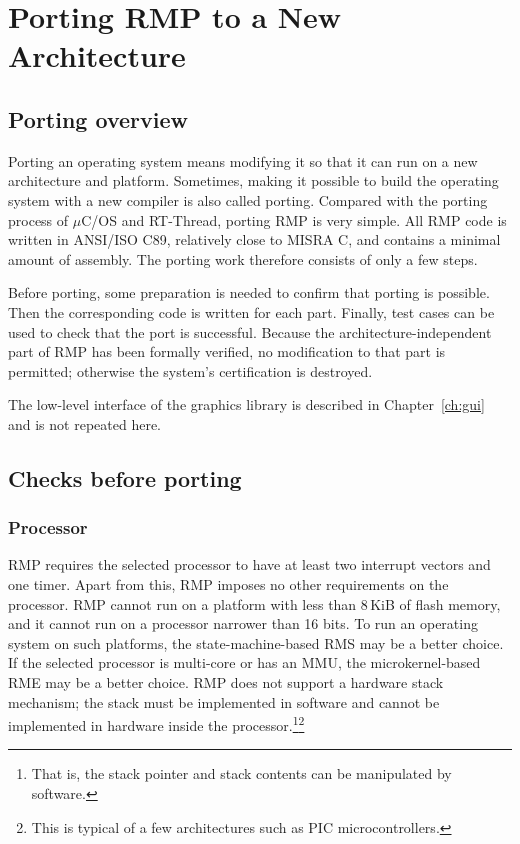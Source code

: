 \chapter{Porting RMP to a New Architecture}\label{ch:porting}

\section{Porting overview}

Porting an operating system means modifying it so that it can run on a new architecture and platform.
Sometimes, making it possible to build the operating system with a new compiler is also called porting.
Compared with the porting process of $\mu$C/OS and RT-Thread, porting RMP is very simple.
All RMP code is written in ANSI/ISO C89, relatively close to MISRA C, and contains a minimal amount of assembly.
The porting work therefore consists of only a few steps.

Before porting, some preparation is needed to confirm that porting is possible.
Then the corresponding code is written for each part.
Finally, test cases can be used to check that the port is successful.
Because the architecture-independent part of RMP has been formally verified, no modification to that part is permitted; otherwise the system's certification is destroyed.

The low-level interface of the graphics library is described in Chapter~\ref{ch:gui} and is not repeated here.

\section{Checks before porting}

\subsection{Processor}

RMP requires the selected processor to have at least two interrupt vectors and one timer.
Apart from this, RMP imposes no other requirements on the processor.
RMP cannot run on a platform with less than 8\,KiB of flash memory, and it cannot run on a processor narrower than 16 bits.
To run an operating system on such platforms, the state-machine-based RMS may be a better choice.
If the selected processor is multi-core or has an MMU, the microkernel-based RME may be a better choice.
RMP does not support a hardware stack mechanism; the stack must be implemented in software and cannot be implemented in hardware inside the processor.\footnote{That is, the stack pointer and stack contents can be manipulated by software.}\footnote{This is typical of a few architectures such as PIC microcontrollers.}

